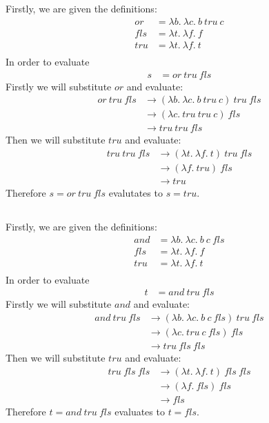 \documentclass[letterpaper]{article}
\theoremstyle{plain}
\theoremstyle{definition}
\theoremstyle{remark}
\begin{document}
\subsection{}

Firstly, we are given the definitions:
\begin{align*}
    or &= \lambda{b}.~\lambda{c}.~b~tru~c\\
    fls &= \lambda{t}.~\lambda{f}.~f\\
    tru &= \lambda{t}.~\lambda{f}.~t\\
\end{align*}
In order to evaluate 
\begin{align*}
    s &= or~tru~fls
\end{align*}
Firstly we will substitute $or$ and evaluate:
\begin{align*}
    or~tru~fls &\to (\lambda{b}.~\lambda{c}.~b~tru~c)~tru~fls\\
    &\to (\lambda{c}.~tru~tru~c)~fls\\
    &\to tru~tru~fls
\end{align*}
Then we will substitute $tru$ and evaluate:
\begin{align*}
    tru~tru~fls &\to (\lambda{t}.~\lambda{f}.~t)~tru~fls\\
    &\to (\lambda{f}.~tru)~fls\\
    &\to tru
\end{align*}
Therefore $s = or~tru~fls$ evalutates to $s = tru$.

\subsection{}

Firstly, we are given the definitions:
\begin{align*}
    and &= \lambda{b}.~\lambda{c}.~b~c~fls\\
    fls &= \lambda{t}.~\lambda{f}.~f\\
    tru &= \lambda{t}.~\lambda{f}.~t\\
\end{align*}
In order to evaluate 
\begin{align*}
    t &= and~tru~fls
\end{align*}
Firstly we will substitute $and$ and evaluate:
\begin{align*}
    and~tru~fls &\to (\lambda{b}.~\lambda{c}.~b~c~fls)~tru~fls\\
    &\to (\lambda{c}.~tru~c~fls)~fls\\
    &\to tru~fls~fls
\end{align*}
Then we will substitute $tru$ and evaluate:
\begin{align*}
    tru~fls~fls &\to (\lambda{t}.~\lambda{f}.~t)~fls~fls\\
    &\to (\lambda{f}.~fls)~fls\\
    &\to fls
\end{align*}
Therefore $t = and~tru~fls$ evaluates to $t = fls$.
\end{document}
